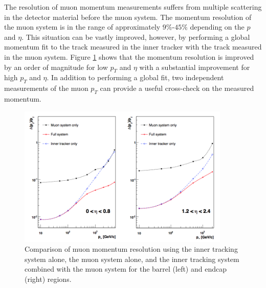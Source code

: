 The resolution of muon momentum measurements suffers from multiple scattering in the detector material before the muon system.
The momentum resolution of the muon system is in the range of approximately $9\%$-$45\%$ depending on the $p$ and $\eta$.
This situation can be vastly improved, however, by performing a global momentum fit to the track measured in the inner tracker with the track measured in the muon system.
Figure \ref{fig:muonres} shows that the momentum resolution is improved by an order of magnitude for low $p_{T}$ and $\eta$ with a substantial improvement for high $p_{T}$ and $\eta$. 
In addition to performing a global fit, two independent measurements of the muon $p_{T}$ can provide a useful cross-check on the measured momentum.
\begin{figure}[htpb]
\begin{center}
\includegraphics[width=0.9\textwidth]{plots/muonres.png}
\caption{Comparison of muon momentum resolution using the inner tracking system alone, the muon system alone, and the inner tracking system combined with the muon system for the barrel (left) and endcap (right) regions\cite{CMS_DETECTOR}.}
\label{fig:muonres}
\end{center}
\end{figure}


